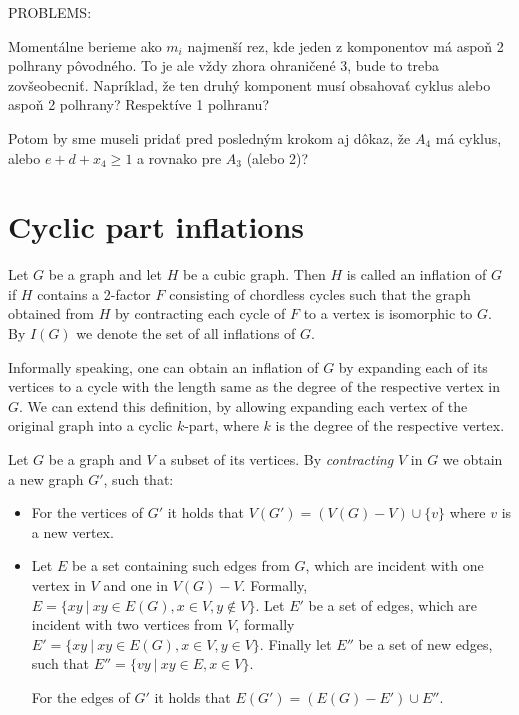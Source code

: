 \documentclass[12pt, twoside]{book}
\begin{document}
PROBLEMS:

Momentálne berieme ako $m_i$ najmenší rez, kde jeden z komponentov má aspoň 2 polhrany pôvodného. To je ale vždy zhora ohraničené 3, bude to treba zovšeobecniť. Napríklad, že ten druhý komponent musí obsahovať cyklus alebo aspoň 2 polhrany? Respektíve 1 polhranu?

Potom by sme museli pridať pred posledným krokom aj dôkaz, že $A_4$ má cyklus, alebo $e+d+x_4\geq 1$ a rovnako pre $A_3$ (alebo 2)? 


\section{Cyclic part inflations}\label{sec:cyclic-part-inflations}

\begin{definition}
	Let $G$ be a graph and let $H$ be a cubic graph. Then $H$ is called an inflation of $G$ if $H$ contains a 2-factor $F$ consisting of chordless cycles such that the graph obtained from $H$ by contracting each cycle of $F$ to a vertex is isomorphic to $G$. By $I(G)$ we denote the set of all inflations of $G$.
\end{definition}

Informally speaking, one can obtain an inflation of $G$ by expanding each of its vertices to a cycle with the length same as the degree of the respective vertex in $G$. We can extend this definition, by allowing expanding each vertex of the original graph into a cyclic $k$-part, where $k$ is the degree of the respective vertex.


Let $G$ be a graph and $V$ a subset of its vertices. By \textit{contracting} $V$ in $G$ we obtain a new graph $G'$, such that:
\begin{itemize}
	\item For the vertices of $G'$ it holds that $V(G') = (V(G)-V)\cup \{v\}$ where $v$ is a new vertex.
	\item Let $E$ be a set containing such edges from $G$, which are incident with one vertex in $V$ and one in $V(G)-V$. Formally, ${E=\{xy~|~xy\in E(G), x\in V, y\notin V\}}$. Let $E'$ be a set of edges, which are incident with two vertices from $V$, formally ${E'=\{xy ~|~ xy\in E(G), x\in V, y\in V\}}$. Finally let $E''$ be a set of new edges, such that $E''=\{vy~|~ xy\in E, x\in V\}$.
	
	For the edges of $G'$ it holds that ${E(G')=(E(G)-E')\cup E''}$.
\end{itemize}
\end{document}
